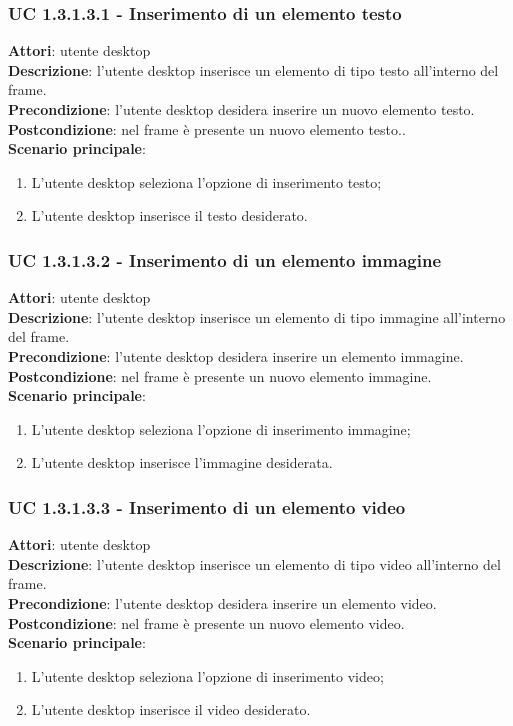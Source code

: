 \subsubsection{UC 1.3.1.3.1 - Inserimento di un elemento testo}{
	\label{uc1.3.1.3.1}
	\textbf{Attori}: utente desktop \\
	\textbf{Descrizione}: l'utente desktop inserisce un elemento di tipo testo all'interno del frame. \\
	\textbf{Precondizione}: l'utente desktop desidera inserire un nuovo elemento testo.	\\
	\textbf{Postcondizione}: nel frame è presente un nuovo elemento testo..	\\
	\textbf{Scenario principale}:
	\begin{enumerate}
		\item L'utente desktop seleziona l'opzione di inserimento testo;
		\item L'utente desktop inserisce il testo desiderato.
	\end{enumerate}
	}
\subsubsection{UC 1.3.1.3.2 - Inserimento di un elemento immagine}{
	\label{uc1.3.1.3.2}
	\textbf{Attori}: utente desktop \\
	\textbf{Descrizione}: l'utente desktop inserisce un elemento di tipo immagine all'interno del frame. \\
	\textbf{Precondizione}: l'utente desktop desidera inserire un elemento immagine.	\\
	\textbf{Postcondizione}: nel frame è presente un nuovo elemento immagine.	\\
	\textbf{Scenario principale}:
	\begin{enumerate}
		\item L'utente desktop seleziona l'opzione di inserimento immagine;
		\item L'utente desktop inserisce l'immagine desiderata.
	\end{enumerate}
	}
\subsubsection{UC 1.3.1.3.3 - Inserimento di un elemento video}{
	\label{uc1.3.1.3.3}
	\textbf{Attori}: utente desktop \\
	\textbf{Descrizione}: l'utente desktop inserisce un elemento di tipo video all'interno del frame. \\
	\textbf{Precondizione}: l'utente desktop desidera inserire un elemento video.	\\
	\textbf{Postcondizione}: nel frame è presente un nuovo elemento video.	\\
	\textbf{Scenario principale}:
	\begin{enumerate}
		\item L'utente desktop seleziona l'opzione di inserimento video;
		\item L'utente desktop inserisce il video desiderato.
	\end{enumerate}
	}
